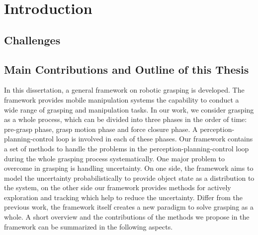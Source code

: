 
\chapter{Introduction}

\section{Challenges}


\section{Main Contributions and Outline of this Thesis}
In this dissertation, a general framework on robotic grasping is developed. The framework provides mobile manipulation systems the capability to conduct a wide range of grasping and manipulation tasks. In our work, we consider grasping as a whole process, which can be divided into three phases in the order of time: pre-grasp phase, grasp motion phase and force closure phase. A perception-planning-control loop is involved in each of these phases. Our framework contains a set of  methods to handle the problems in the perception-planning-control loop during the whole grasping process systematically. One major problem to overcome in grasping is handling uncertainty. On one side, the framework aims to model the uncertainty probabilistically to provide object state as a distribution to the system, on the other side our framework provides methods for actively exploration and tracking which help to reduce the uncertainty. Differ from the previous work, the framework itself creates a new paradigm to solve grasping as a whole. A short overview and the contributions of the methods we propose in the framework can be summarized in the following aspects. 


